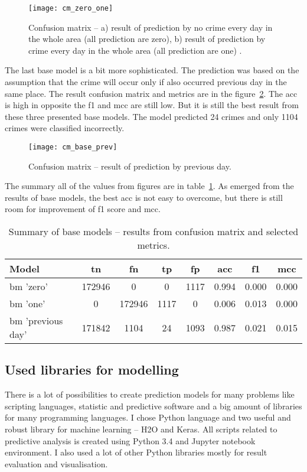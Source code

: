 \documentclass[thesis=M,english]{FITthesis}[2012/10/20]
\begin{document}
\begin{figure}[ht]\centering
    \texttt{[image: cm\_zero\_one]}
    \caption{Confusion matrix -- a) result of prediction by no crime every day in the whole area (all prediction are zero), b) result of prediction by crime every day in the whole area (all prediction are one) .}\label{fig:base_zero_one}
\end{figure}

The last base model is a bit more sophisticated. The prediction was based on the assumption that the crime will occur only if also occurred previous day in the same place. The result confusion matrix and metrics are in the figure~\ref{fig:base_prev}. The \gls{acc} is high in opposite the \gls{f1} and \gls{mcc} are still low. But it is still the best result from these three presented base models. The model predicted 24 crimes and only 1104 crimes were classified incorrectly. 

\begin{figure}[ht]\centering
    \texttt{[image: cm\_base\_prev]}
    \caption{Confusion matrix -- result of prediction by previous day.}\label{fig:base_prev}
\end{figure}

The summary all of the values from figures are in table~\ref{tab:base_summary}. As emerged from the results of base models, the best \gls{acc} is not easy to overcome, but there is still room for improvement of \gls{f1} score and \gls{mcc}.

\begin{table}[H]\centering
\begin{small}
    \caption{Summary of base models -- results from confusion matrix and selected metrics.}\label{tab:base_summary}
    \begin{tabular}{|l|c|c|c|c|c|c|c|}\hline
        Model & \gls{tn} & \gls{fn} & \gls{tp} & \gls{fp} & \gls{acc} & \gls{f1} & \gls{mcc} \tabularnewline \hline \hline
        \gls{bm} 'zero' & 172946 & 0 & 0 & 1117 & 0.994 & 0.000 & 0.000 \tabularnewline \hline
        \gls{bm} 'one' & 0 & 172946 & 1117 & 0 & 0.006 & 0.013 & 0.000 \tabularnewline \hline
        \gls{bm} 'previous day' & 171842 & 1104 & 24 & 1093 & 0.987 & 0.021 & 0.015 \tabularnewline \hline
    \end{tabular}
\end{small}
\end{table}

\subsection{Used libraries for modelling}
There is a lot of possibilities to create prediction models for many problems like scripting languages, statistic and predictive software and a big amount of libraries for many programming languages. I chose Python language and two useful and robust library for machine learning -- H2O\cite{h2o_soft} and Keras\cite{keras_soft}. All scripts related to predictive analysis is created using Python 3.4 and Jupyter notebook environment. I also used a lot of other Python libraries mostly for result evaluation and visualisation.
\end{document}
